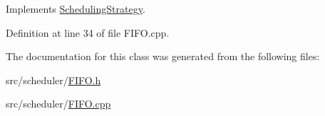 Implements \hyperlink{class_scheduling_strategy_a62ffa0426528c14fdd0b0853f04a851f}{Scheduling\+Strategy}.



Definition at line 34 of file F\+I\+F\+O.\+cpp.



The documentation for this class was generated from the following files\+:\begin{DoxyCompactItemize}
\item 
src/scheduler/\hyperlink{_f_i_f_o_8h}{F\+I\+F\+O.\+h}\item 
src/scheduler/\hyperlink{_f_i_f_o_8cpp}{F\+I\+F\+O.\+cpp}\end{DoxyCompactItemize}
